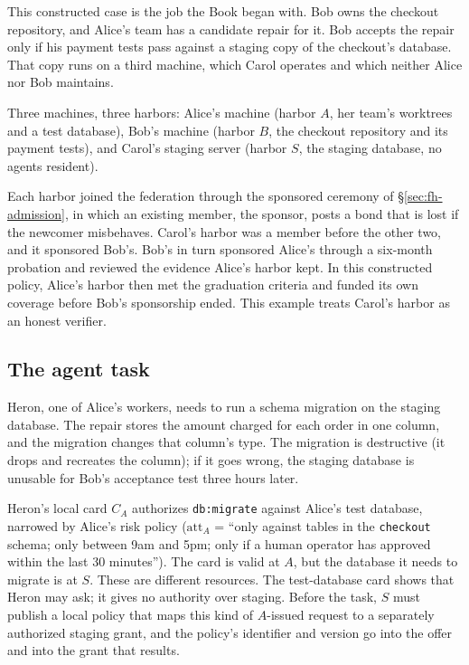 \documentclass[11pt,a4paper]{article}
\theoremstyle{definition}
\theoremstyle{remark}
\begin{document}
This constructed case is the job the Book began with. Bob owns the checkout repository, and Alice's team has a candidate repair for it. Bob accepts the repair only if his payment tests pass against a staging copy of the checkout's database. That copy runs on a third machine, which Carol operates and which neither Alice nor Bob maintains.

Three machines, three harbors: Alice's machine (harbor $A$, her team's worktrees and a test database), Bob's machine (harbor $B$, the checkout repository and its payment tests), and Carol's staging server (harbor $S$, the staging database, no agents resident).

Each harbor joined the federation through the sponsored ceremony of \S\ref{sec:fh-admission}, in which an existing member, the sponsor, posts a bond that is lost if the newcomer misbehaves. Carol's harbor was a member before the other two, and it sponsored Bob's. Bob's in turn sponsored Alice's through a six-month probation and reviewed the
evidence Alice's harbor kept. In this constructed policy, Alice's harbor then met the graduation
criteria and funded its own coverage before Bob's sponsorship ended. This example treats Carol's harbor as an honest verifier.

\subsection{The agent task}\label{sec:fh-ex-task}

Heron, one of Alice's workers, needs to run a schema migration on the staging database. The repair stores the amount charged for each order in one column, and the migration changes that column's type. The migration is destructive (it drops and recreates the column); if it goes wrong, the staging database is unusable for Bob's acceptance test three hours later.

Heron's local card $C_A$ authorizes \texttt{db:migrate} against Alice's test database, narrowed by Alice's risk policy ($\mathrm{att}_A$ = ``only against tables in the \texttt{checkout} schema; only between 9am and 5pm; only if a human operator has approved within the last 30 minutes''). The card is valid at $A$, but the database it needs to migrate is at $S$.
These are different resources. The test-database card shows that Heron
may ask; it gives no authority over staging. Before the task, $S$ must publish a
local policy that maps this kind of $A$-issued request to a separately
authorized staging grant, and the policy's identifier and version go into the
offer and into the grant that results.
\end{document}
